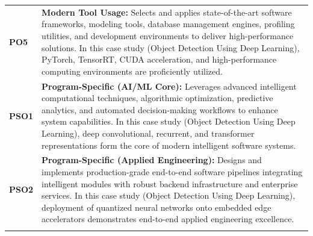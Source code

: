 {\begin{longtable}{@{}>{\centering\arraybackslash}p{1.8cm} p{13.2cm}@{}}
    \addlinespace
\textbf{PO5} & \textbf{Modern Tool Usage:} Selects and applies state-of-the-art software frameworks, modeling tools, database management engines, profiling utilities, and development environments to deliver high-performance solutions. In this case study (Object Detection Using Deep Learning), PyTorch, TensorRT, CUDA acceleration, and high-performance computing environments are proficiently utilized. \\
    \addlinespace
\textbf{PSO1} & \textbf{Program-Specific (AI/ML Core):} Leverages advanced intelligent computational techniques, algorithmic optimization, predictive analytics, and automated decision-making workflows to enhance system capabilities. In this case study (Object Detection Using Deep Learning), deep convolutional, recurrent, and transformer representations form the core of modern intelligent software systems. \\
    \addlinespace
\textbf{PSO2} & \textbf{Program-Specific (Applied Engineering):} Designs and implements production-grade end-to-end software pipelines integrating intelligent modules with robust backend infrastructure and enterprise services. In this case study (Object Detection Using Deep Learning), deployment of quantized neural networks onto embedded edge accelerators demonstrates end-to-end applied engineering excellence. \\
    \addlinespace
    \bottomrule
\end{longtable}}
